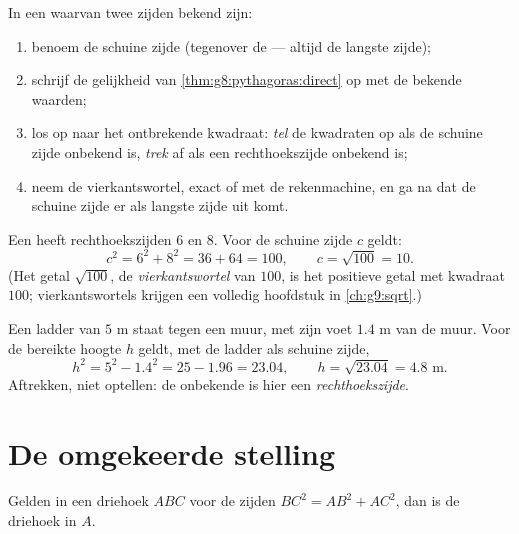 \begin{method}\label{met:g8:pythagoras:compute}
In een  waarvan twee zijden bekend zijn:
\begin{enumerate}
  \item benoem de schuine zijde (tegenover de  --- altijd de langste
        zijde);
  \item schrijf de gelijkheid van \cref{thm:g8:pythagoras:direct} op met de
        bekende waarden;
  \item los op naar het ontbrekende kwadraat: \emph{tel} de kwadraten op als de
        schuine zijde onbekend is, \emph{trek} af als een rechthoekszijde
        onbekend is;
  \item neem de vierkantswortel, exact of met de rekenmachine, en ga na dat de
        schuine zijde er als langste zijde uit komt.
\end{enumerate}
\end{method}

\begin{example}\label{ex:g8:pythagoras:hypotenuse}
Een  heeft rechthoekszijden $6$ en $8$. Voor de schuine
zijde $c$ geldt:
\[
c^2 = 6^2 + 8^2 = 36 + 64 = 100,
\qquad
c = \sqrt{100} = 10 .
\]
(Het getal $\sqrt{100}$, de \emph{vierkantswortel} van $100$, is het positieve
getal met kwadraat $100$; vierkantswortels krijgen een volledig hoofdstuk in
\cref{ch:g9:sqrt}.)
\end{example}

\begin{example}\label{ex:g8:pythagoras:leg}
Een ladder van $5$ m staat tegen een muur, met zijn voet $1.4$ m van de muur.
Voor de bereikte hoogte $h$ geldt, met de ladder als schuine zijde,
\[
h^2 = 5^2 - 1.4^2 = 25 - 1.96 = 23.04,
\qquad
h = \sqrt{23.04} = 4.8 \text{ m}.
\]
Aftrekken, niet optellen: de onbekende is hier een \emph{rechthoekszijde}.
\end{example}

\section{De omgekeerde stelling}

\begin{theorem}\label{thm:g8:pythagoras:converse}
Gelden in een driehoek $ABC$ voor de zijden $BC^2 = AB^2 + AC^2$, dan is de
driehoek  in $A$.
\end{theorem}
\admitted

